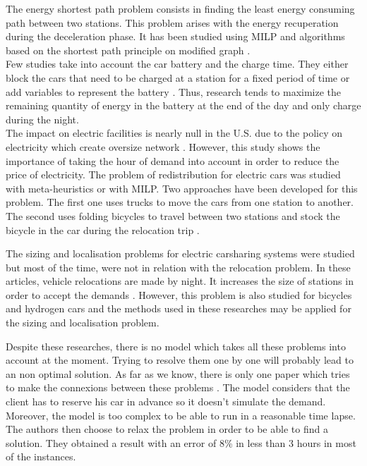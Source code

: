 \begin{bibunit}[ieeetr]
The energy shortest path problem consists in finding the least energy consuming path between two stations.
This problem arises with the energy recuperation during the deceleration phase.
It has been studied using MILP \cite{touati_combinatorial_2012} and algorithms based on the shortest path principle on modified graph \cite{artmeier_optimal_2010}.\\
Few studies take into account the car battery and the charge time.
They either block the cars that need to be charged at a station for a fixed period of time \cite{boyaci_optimization_2015} or add variables to represent the battery \cite{bruglieri_vehicle_2014}.
Thus, research tends to maximize the remaining quantity of energy in the battery at the end of the day and only charge during the night.\\
The impact on electric facilities is nearly null in the U.S. due to the policy on electricity which create oversize network \cite{liu_survey_2011}.
However, this study shows the importance of taking the hour of demand into account in order to reduce the price of electricity. 
The problem of redistribution for electric cars was studied with meta-heuristics or with MILP.
Two approaches have been developed for this problem.
The first one uses trucks to move the cars from one station to another.
The second uses folding bicycles to travel between two stations and stock the bicycle in the car during the relocation trip \cite{bruglieri_vehicle_2014}.

The sizing and localisation problems for electric carsharing systems were studied but most of the time, were not in relation with the relocation problem.
In these articles, vehicle relocations are made by night.
It increases the size of stations in order to accept the demands \cite{correia_optimization_2012}.
However, this problem is also studied for bicycles \cite{george_fleet_2011} and hydrogen cars \cite{melaina_initiating_2003} and the methods used in these researches may be applied for the sizing and localisation problem.

Despite these researches, there is no model which takes all these problems into account at the moment.
Trying to resolve them one by one will probably lead to an non optimal solution.
As far as we know, there is only one paper which tries to make the connexions between these problems \cite{boyaci_optimization_2015}.
The model considers that the client has to reserve his car in advance so it doesn't simulate the demand.
Moreover, the model is too complex to be able to run in a reasonable time lapse.
The authors then choose to relax the problem in order to be able to find a solution.
They obtained a result with an error of 8\% in less than 3 hours in most of the instances.


\end{bibunit}
